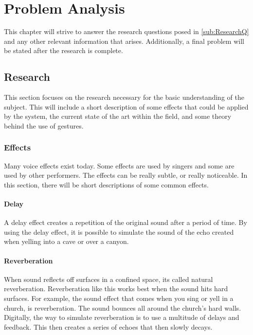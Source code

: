 \chapter{Problem Analysis}
This chapter will strive to answer the research questions posed in \ref{sub:ResearchQ} and any other relevant information that arises. Additionally, a final problem will be stated after the research is complete.


\section{Research}
This section focuses on the research necessary for the basic understanding of the subject. This will include a short description of some effects that could be applied by the system, the current state of the art within the field, and some theory behind the use of gestures.

\subsection{Effects}
Many voice effects exist today. Some effects are used by singers and some are used by other performers. The effects can be really subtle, or really noticeable.
In this section, there will be short descriptions of some common effects.


\subsubsection{Delay}

A delay effect creates a repetition of the original sound after a period of time\citep{Loeffler_2014}. By using the delay effect, it is possible to simulate the sound of the echo created when yelling into a cave or over a canyon.

\subsubsection{Reverberation}

When sound reflects off surfaces in a confined space, its called natural reverberation\citep{Redmon_1997}. Reverberation like this works best when the sound hits hard surfaces. For example, the sound effect that comes when you sing or yell in a church, is reverberation. The sound bounces all around the church's hard walls.
Digitally, the way to simulate reverberation is to use a multitude of delays and feedback. This then creates a series of echoes that then slowly decays.

